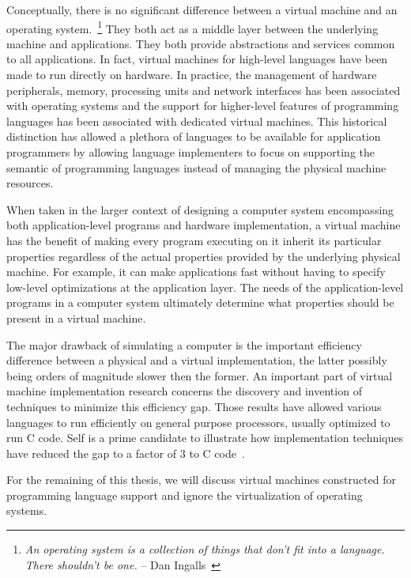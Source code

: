 Conceptually, there is no significant difference between a virtual machine and
an operating system.~\footnote{\textit{An operating system is a collection of
things that don't fit into a language. There shouldn't be one.} -- Dan
Ingalls~\cite{Ingalls1981}} They both act as a middle layer between the
underlying machine and applications. They both provide abstractions and
services common to all applications. In fact, virtual machines for high-level
languages have been made to run directly on hardware. In practice, the
management of hardware peripherals, memory, processing units and network
interfaces has been associated with operating systems and the support for
higher-level features of programming languages has been associated with
dedicated virtual machines. This historical distinction has allowed a plethora
of languages to be available for application programmers by allowing language
implementers to focus on supporting the semantic of programming languages
instead of managing the physical machine resources.

When taken in the larger context of designing a computer system encompassing
both application-level programs and hardware implementation, a virtual machine
has the benefit of making every program executing on it inherit its particular
properties regardless of the actual properties provided by the underlying
physical machine. For example, it can make applications fast without having to
specify low-level optimizations at the application layer. The needs of the
application-level programs in a computer system ultimately determine what
properties should be present in a virtual machine.



The major drawback of simulating a computer is the important efficiency
difference between a physical and a virtual implementation, the latter possibly
being orders of magnitude slower then the former. An important part of virtual
machine implementation research concerns the discovery and invention of
techniques to minimize this efficiency gap. Those results have allowed various
languages to run efficiently on general purpose processors, usually optimized
to run C code. Self is a prime candidate to illustrate how implementation
techniques have reduced the gap to a factor of 3 to C code~\cite{hoezle_self_oo}.

For the remaining of this thesis, we will 
discuss virtual machines constructed for programming language support and
ignore the virtualization of operating systems.


